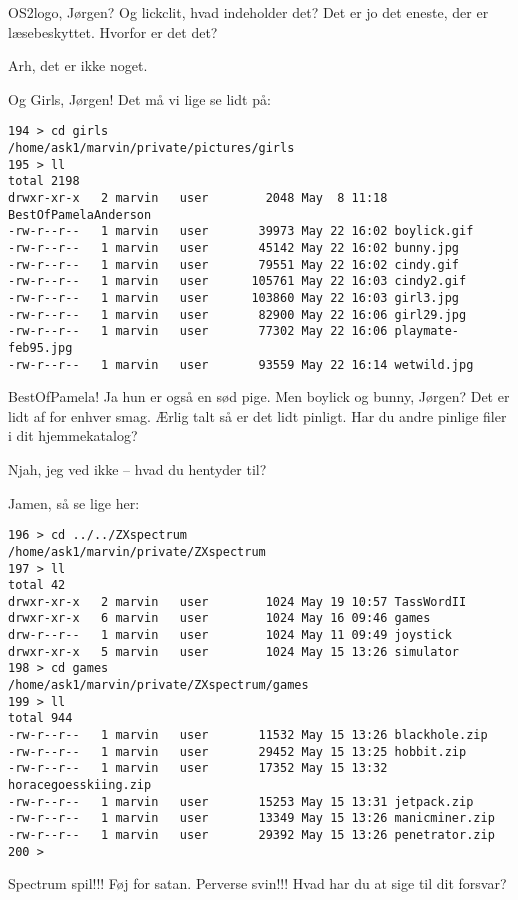 \documentclass[10pt]{article}
\begin{document}
\begin{sketch}
 OS2logo, Jørgen? Og lickclit, hvad indeholder det? 
Det er jo det eneste, der er læsebeskyttet. Hvorfor er det det?

 Arh, det er ikke noget.

 Og Girls, Jørgen! Det må vi lige se lidt på:

\begin{verbatim}
194 > cd girls
/home/ask1/marvin/private/pictures/girls
195 > ll
total 2198
drwxr-xr-x   2 marvin   user        2048 May  8 11:18 BestOfPamelaAnderson
-rw-r--r--   1 marvin   user       39973 May 22 16:02 boylick.gif
-rw-r--r--   1 marvin   user       45142 May 22 16:02 bunny.jpg
-rw-r--r--   1 marvin   user       79551 May 22 16:02 cindy.gif
-rw-r--r--   1 marvin   user      105761 May 22 16:03 cindy2.gif
-rw-r--r--   1 marvin   user      103860 May 22 16:03 girl3.jpg
-rw-r--r--   1 marvin   user       82900 May 22 16:06 girl29.jpg
-rw-r--r--   1 marvin   user       77302 May 22 16:06 playmate-feb95.jpg
-rw-r--r--   1 marvin   user       93559 May 22 16:14 wetwild.jpg
\end{verbatim}

 BestOfPamela! Ja hun er også en sød pige. Men
boylick og bunny, Jørgen? Det er lidt af for enhver smag.
Ærlig talt så er det lidt pinligt.
Har du andre pinlige filer i dit hjemmekatalog?

 Njah, jeg ved ikke -- hvad du hentyder til?

 Jamen, så se lige her:

\begin{verbatim}
196 > cd ../../ZXspectrum
/home/ask1/marvin/private/ZXspectrum
197 > ll
total 42
drwxr-xr-x   2 marvin   user        1024 May 19 10:57 TassWordII
drwxr-xr-x   6 marvin   user        1024 May 16 09:46 games
drw-r--r--   1 marvin   user        1024 May 11 09:49 joystick
drwxr-xr-x   5 marvin   user        1024 May 15 13:26 simulator
198 > cd games
/home/ask1/marvin/private/ZXspectrum/games
199 > ll
total 944
-rw-r--r--   1 marvin   user       11532 May 15 13:26 blackhole.zip
-rw-r--r--   1 marvin   user       29452 May 15 13:25 hobbit.zip
-rw-r--r--   1 marvin   user       17352 May 15 13:32 horacegoesskiing.zip
-rw-r--r--   1 marvin   user       15253 May 15 13:31 jetpack.zip
-rw-r--r--   1 marvin   user       13349 May 15 13:26 manicminer.zip
-rw-r--r--   1 marvin   user       29392 May 15 13:26 penetrator.zip
200 > 
\end{verbatim}

 Spectrum spil!!! Føj for satan. Perverse svin!!! Hvad har du at
sige til dit forsvar?


\end{sketch}
\end{document}
